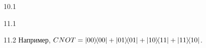 \protect \hypertarget {soln:10.1}{}
\begin{solution}{{10.1}}
  
\end{solution}
\protect \hypertarget {soln:11.1}{}
\begin{solution}{{11.1}}
  
\end{solution}
\protect \hypertarget {soln:11.2}{}
\begin{solution}{{11.2}}
  Например, $CNOT = \ketbra{00}{00} + \ketbra{01}{01} + \ketbra{10}{11} + \ketbra{11}{10}$.
\end{solution}
